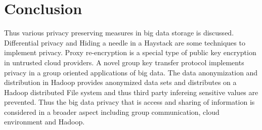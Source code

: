 \documentclass[10pt,a4paper,journal]{IEEEtran}
\begin{document}
\section{Conclusion}
\hspace{2em} Thus various privacy preserving measures in big data storage is discussed. Differential privacy and Hiding a needle in a Haystack are some techniques to implement privacy. Proxy re-encryption is a special type of public key encryption in untrusted cloud providers. A novel group key transfer protocol implements privacy in a group oriented applications of big data. The data anonymization and distribution in Hadoop provides anonymized data sets and distributes on a Hadoop distributed File system and thus third party infereing sensitive values are prevented. Thus the big data privacy that is access and sharing of information is considered in a broader aspect including group communication, cloud environment and Hadoop.
\end{document}
